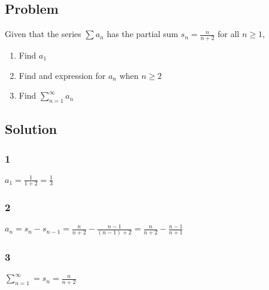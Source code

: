 \documentclass[12pt]{article}
\begin{document}
\subsection*{Problem}
Given that the series $\sum a_n$ has the partial sum $s_n = \frac{n}{n+2}$ for all $n \geq 1$,
\begin{enumerate}
    \item Find $a_1$
    \item Find and expression for $a_n$ when $n \geq 2$
    \item Find $\sum_{n=1}^\infty a_n$
\end{enumerate}

\subsection*{Solution}

\subsubsection*{1}
$a_1 = \frac{1}{1+2} = \frac{1}{3}$

\subsubsection*{2}
$a_n = s_n - s_{n-1} = \frac{n}{n+2} - \frac{n-1}{(n-1)+2} = \frac{n}{n+2} - \frac{n-1}{n+1}$

\subsubsection*{3}
$\sum_{n=1}^\infty = s_n = \frac{n}{n+2}$
\end{document}
